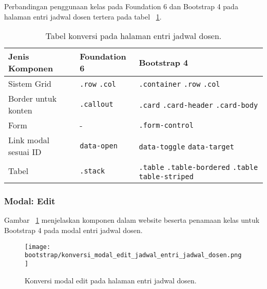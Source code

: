 \noindent Perbandingan penggunaan kelas pada Foundation 6 dan Bootstrap 4 pada halaman entri jadwal dosen tertera pada tabel ~\ref{table:konversiEntriJadwalDosen}.\\
\begin{table}[H]
	\caption{Tabel konversi pada halaman entri jadwal dosen.}
	\begin{tabular}{| p{} | p{} | p{} |} 
		\hline
		\textbf{Jenis Komponen} & \textbf{Foundation 6} & \textbf{Bootstrap 4}  \\ [0.5ex] 
		\hline	
		Sistem Grid & \texttt{.row} \newline \texttt{.col} &   \texttt{.container} \newline \texttt{.row} \newline \texttt{.col} \\ 
		\hline	
		Border untuk konten & \texttt{.callout} &  \texttt{.card} \newline \texttt{.card-header} \newline \texttt{.card-body} \\
		\hline
		Form & - & \texttt{.form-control} \\	
		\hline		
		Link modal sesuai ID & \texttt{data-open} & \texttt{data-toggle} \newline \texttt{data-target}\\
		\hline	
		Tabel & \texttt{.stack} & \texttt{.table} \newline \texttt{.table-bordered} \newline \texttt{.table table-striped}  \\[1ex]
		\hline	
	\end{tabular}
	\label{table:konversiEntriJadwalDosen}
\end{table}

\subsubsection{Modal: Edit}
\noindent Gambar ~\ref{fig:konversiEditEntriJadwalDosen} menjelaskan komponen dalam website beserta penamaan kelas untuk Bootstrap 4 pada modal entri jadwal dosen.\\
\begin{figure} [H]
	\centering  
	\texttt{[image: bootstrap/konversi\_modal\_edit\_jadwal\_entri\_jadwal\_dosen.png]}
	\caption{Konversi modal edit pada halaman entri jadwal dosen.}
	\label{fig:konversiEditEntriJadwalDosen}
\end{figure}

